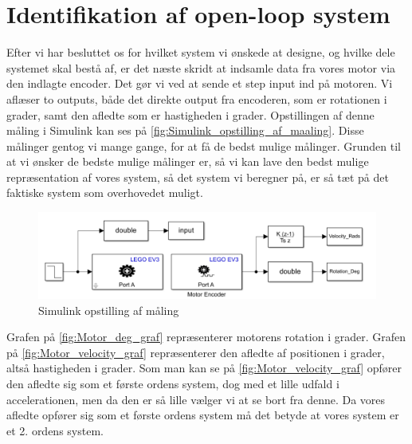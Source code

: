\graphicspath{{Chapters/Identifikation_af_open_loop_system/}}

\section{Identifikation af open-loop system}

Efter vi har besluttet os for hvilket system vi ønskede at designe, og hvilke dele systemet skal bestå af, er det næste skridt at indsamle data fra vores motor via den indlagte encoder. Det gør vi ved at sende et step input ind på motoren. Vi aflæser to outputs, både det direkte output fra encoderen, som er rotationen i grader, samt den afledte som er hastigheden i grader. Opstillingen af denne måling i Simulink kan ses på \autoref{fig:Simulink_opstilling_af_maaling}. Disse målinger gentog vi mange gange, for at få de bedst mulige målinger. Grunden til at vi ønsker de bedste mulige målinger er, så vi kan lave den bedst mulige repræsentation af vores system, så det system vi beregner på, er så tæt på det faktiske system som overhovedet muligt.
  
\begin{figure}[H]
	\centering
	\includegraphics[width = 400pt]{Img/Simulink_opstilling_af_maaling.png}
	\caption{Simulink opstilling af måling}
	\label{fig:Simulink_opstilling_af_maaling}
\end{figure}

Grafen på \autoref{fig:Motor_deg_graf} repræsenterer motorens rotation i grader. Grafen på \autoref{fig:Motor_velocity_graf} repræsenterer den afledte af positionen i grader, altså hastigheden i grader. Som man kan se på \autoref{fig:Motor_velocity_graf} opfører den afledte sig som et første ordens system, dog med et lille udfald i accelerationen, men da den er så lille vælger vi at se bort fra denne. Da vores afledte opfører sig som et første ordens system må det betyde at vores system er et 2. ordens system. 

